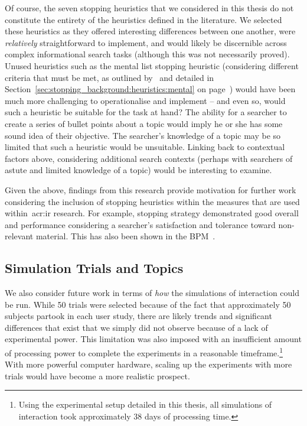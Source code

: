 Of course, the seven stopping heuristics that we considered in this thesis do not constitute the entirety of the heuristics defined in the literature. We selected these heuristics as they offered interesting differences between one another, were \emph{relatively} straightforward to implement, and would likely be discernible across complex informational search tasks (although this was not necessarily proved). Unused heuristics such as the mental list stopping heuristic (considering different criteria that must be met, as outlined by~\cite{nickles1995judgment} and detailed in Section~\ref{sec:stopping_background:heuristics:mental} on page~\pageref{sec:stopping_background:heuristics:mental}) would have been much more challenging to operationalise and implement -- and even so, would such a heuristic be suitable for the task at hand? The ability for a searcher to create a series of bullet points about a topic would imply he or she has some sound idea of their objective. The searcher's knowledge of a topic may be so limited that such a heuristic would be unsuitable. Linking back to contextual factors above, considering additional search contexts (perhaps with searchers of astute and limited knowledge of a topic) would be interesting to examine.

Given the above, findings from this research provide motivation for further work considering the inclusion of stopping heuristics within the measures that are used within~\gls{acr:ir} research. For example, stopping strategy  demonstrated good overall and performance considering a searcher's satisfaction and tolerance toward non-relevant material. This has also been shown in the BPM~\citep{zhang2017bejewled}.

\subsection{Simulation Trials and Topics}\label{sec:conclusions:future:running}
We also consider future work in terms of \emph{how} the simulations of interaction could be run. While 50 trials were selected because of the fact that approximately 50 subjects partook in each user study, there are likely trends and significant differences that exist that we simply did not observe because of a lack of experimental power. This limitation was also imposed with an insufficient amount of processing power to complete the experiments in a reasonable timeframe.\footnote{Using the experimental setup detailed in this thesis, all simulations of interaction took approximately $38$ days of processing time.} With more powerful computer hardware, scaling up the experiments with more trials would have become a more realistic prospect.

